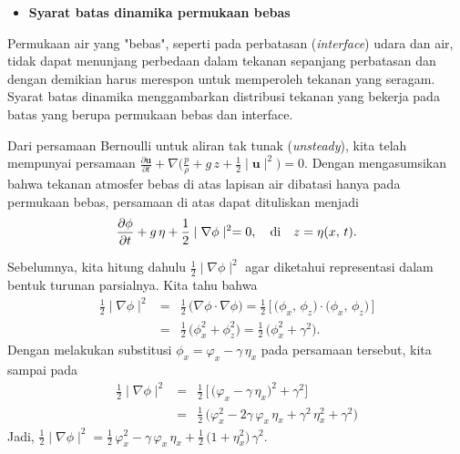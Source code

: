 \documentclass[12pt,a4paper]{report}
\begin{document}
\begin{itemize}
\item  \textbf{Syarat batas dinamika permukaan bebas}
\end{itemize}

Permukaan air yang "bebas", seperti pada perbatasan
(\textit{interface}) udara dan air, tidak dapat menunjang
perbedaan dalam tekanan sepanjang perbatasan dan dengan demikian
harus merespon untuk memperoleh tekanan yang seragam. Syarat
batas dinamika menggambarkan distribusi tekanan yang bekerja pada
batas yang berupa permukaan bebas dan interface.

Dari persamaan Bernoulli untuk aliran tak tunak (\textit{unsteady}), kita
telah mempunyai persamaan $\displaystyle\frac{\partial \mathbf{u}}{\partial t%
}+\nabla\Bigg(\frac{p}{\rho}+g\,z+\frac{1}{2}\mid\mathbf{u}\mid^2\Bigg)=0.$
Dengan mengasumsikan bahwa tekanan atmosfer bebas di atas lapisan air
dibatasi hanya pada permukaan bebas, persamaan di atas dapat dituliskan
menjadi
\begin{equation}
\frac{\partial {\phi}}{\partial t}+ g\,\eta+\frac{1}{2}\mid\nabla\phi%
\mid^2=0, \quad \textmd{di} \quad z =\eta(x,\,t).  \label{bernou}
\end{equation}

Sebelumnya, kita hitung dahulu $\displaystyle \frac{1}{2}\mid
\nabla\phi\mid^2$ agar diketahui representasi dalam bentuk turunan
parsialnya. Kita tahu bahwa
\begin{eqnarray}
\frac{1}{2}\mid\nabla\phi\mid^2 &=& \frac{1}{2}\,\bigg(\nabla\phi\cdot\nabla%
\phi\bigg) =\frac{1}{2}\,\bigg[\,\bigg(\phi_{x},\,\phi_{z}\bigg)\cdot \bigg(%
\phi_{x},\,\phi_{z}\bigg)\,\bigg]  \nonumber \\
&=&\frac{1}{2}\,\bigg(\phi_{x}^2+\phi_{z}^2\bigg) =\frac{1}{2}\,\bigg(%
\phi_{x}^2+\gamma^2\bigg).
\end{eqnarray}
Dengan melakukan substitusi $\phi_{x}=\varphi_{x}-\gamma\,\eta_{x}$ pada
persamaan tersebut, kita sampai pada
\begin{eqnarray}
\frac{1}{2}\mid\nabla\phi\mid^2 &=& \frac{1}{2}\,\bigg[\,\bigg(\varphi_{x}-
\gamma\,\eta_{x}\bigg)^2+\gamma^2\bigg]  \nonumber \\
&=&\frac{1}{2}\,\bigg(\varphi_{x}^2-2\gamma\,\varphi_{x}\,\eta_{x}+
\gamma^2\,\eta_{x}^2+\gamma^2\bigg)
\end{eqnarray}
Jadi, $\displaystyle \frac{1}{2}\mid\nabla\phi\mid^2 = \frac{1}{2}%
\,\varphi_{x}^2 - \gamma\,\varphi_{x}\,\eta_{x} + \frac{1}{2}\,\bigg(%
1+\eta_{x}^2\bigg)\,\gamma^2$.\newline
\end{document}
